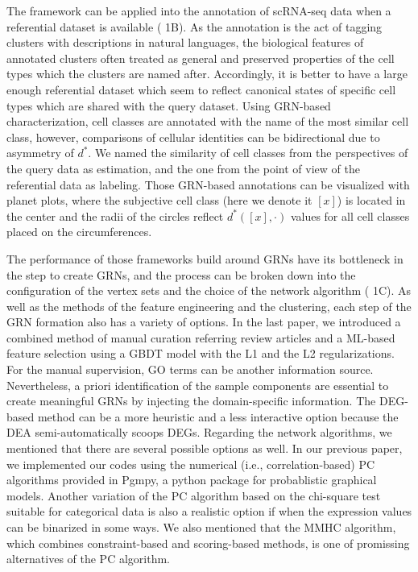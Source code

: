 \documentclass{article}
\begin{document}
The framework can be applied into the annotation of scRNA-seq data when a referential dataset is available 
(\figurename{ 1B}). As the annotation is the act of tagging clusters with descriptions in natural languages, the biological 
features of annotated clusters often treated as general and preserved properties of the cell types which the clusters 
are named after. Accordingly, it is better to have a large enough referential dataset which seem to reflect canonical 
states of specific cell types which are shared with the query dataset. Using GRN-based characterization, cell classes 
are annotated with the name of the most similar cell class, however, comparisons of cellular identities can be 
bidirectional due to asymmetry of $d^*$. We named the similarity of cell classes from the perspectives of the query 
data as estimation, and the one from the point of view of the referential data as labeling. Those GRN-based 
annotations can be visualized with planet plots, where the subjective cell class (here we denote it $[x]$) is located in 
the center and the radii of the circles reflect $d^*([x],\cdot)$ values for all cell classes placed on the circumferences.

The performance of those frameworks build around GRNs have its bottleneck in the step to create GRNs, and 
the process can be broken down into the configuration of the vertex sets and the choice of the network algorithm 
(\figurename{ 1C}). As well as the methods of the feature engineering and the clustering, each step of the GRN formation 
also has a variety of options. In the last paper, we introduced a combined method of manual curation referring 
review articles and a \ac{ML}-based feature selection using a \ac{GBDT} 
model with the L1 and the L2 regularizations\cite{okano2023set}. For the manual supervision, \ac{GO} terms can be 
another information source. Nevertheless, a priori identification of the sample components are essential to create 
meaningful GRNs by injecting the domain-specific information. The \ac{DEG}-based 
method can be a more heuristic and a less interactive option because the \ac{DEA} 
semi-automatically scoops DEGs. Regarding the network algorithms, we mentioned that there are several possible 
options as well. In our previous paper, we implemented our codes using the numerical (i.e., correlation-based) PC 
algorithms provided in Pgmpy\cite{pgmpy}, a python package for probablistic graphical models. Another variation of the PC 
algorithm based on the chi-square test suitable for categorical data is also a realistic option if when the expression 
values can be binarized in some ways. We also mentioned that the \ac{MMHC} algorithm, which 
combines constraint-based and scoring-based methods\cite{tsamardinos2006max}, is one of promissing alternatives of the PC algorithm.
\end{document}
